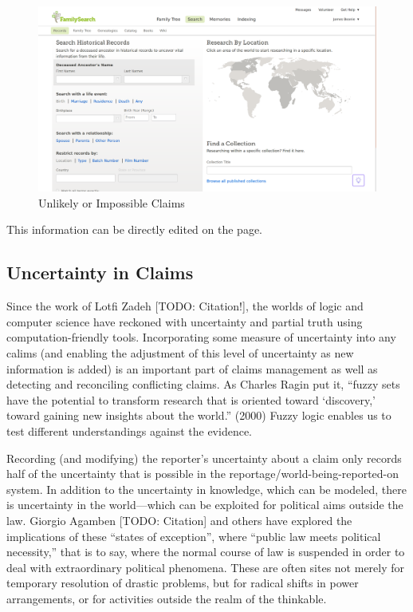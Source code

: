 \documentclass[format=siggraph, review=true]{acmart}
\begin{document}
\begin{figure}[h]
\includegraphics[width=\columnwidth]{images/familysearch/search-records.png}
\caption{Unlikely or Impossible Claims}
\label{fig:data-problems}
\end{figure}













This information can be directly edited on the page.


  
\subsection{Uncertainty in Claims}
Since the work of Lotfi Zadeh [TODO: Citation!], the worlds of logic and computer science have reckoned with uncertainty and partial truth using computation-friendly tools. Incorporating some measure of uncertainty into any calims (and enabling the adjustment of this level of uncertainty as new information is added) is an important part of claims management as well as detecting and reconciling conflicting claims. As Charles Ragin put it, ``fuzzy sets have the potential to transform research that is oriented toward `discovery,' toward gaining new insights about the world.'' (2000) Fuzzy logic enables us to test different understandings against the evidence. 

Recording (and modifying) the reporter's uncertainty about a claim only records half of the uncertainty that is possible in the reportage/world-being-reported-on system. In addition to the uncertainty in knowledge, which can be modeled, there is uncertainty in the world—which can be exploited for political aims outside the law. Giorgio Agamben [TODO: Citation] and others have explored the implications of these ``states of exception'', where ``public law meets political necessity,'' that is to say, where the normal course of law is suspended in order to deal with extraordinary political phenomena.  These are often sites not merely for temporary resolution of drastic problems, but for radical shifts in power arrangements, or for activities outside the realm of the thinkable.  
\end{document}
